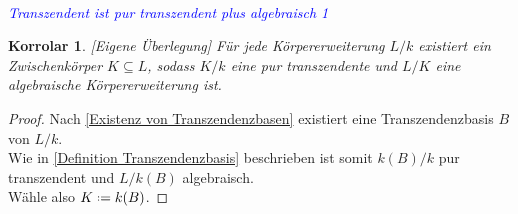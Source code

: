 \documentclass[10pt,a4paper]{report}
\newcounter{Aussage}[chapter]
\newtheorem{korrolar}[Aussage]{Korrolar}
\newcommand*{\defeq}{\mathrel{\vcenter{\baselineskip0.5ex \lineskiplimit0pt
                     \hbox{\scriptsize.}\hbox{\scriptsize.}}}%
                     =}
\begin{document}
\ \\
\textcolor{blue}{\textit{Transzendent ist pur transzendent plus algebraisch 1}}
\begin{korrolar}\label{Transzendent ist pur transzendent plus algebraisch 1}\textit{[Eigene Überlegung]}
Für jede Körpererweiterung $L/k$ existiert ein Zwischenkörper $K \subseteq L$, sodass $K/k$ eine pur transzendente und $L/K$ eine algebraische Körpererweiterung ist.
\end{korrolar}
\begin{proof}
Nach \cref{Existenz von Transzendenzbasen} existiert eine Transzendenzbasis $B$ von $L/k$.\\
Wie in \cref{Definition Transzendenzbasis} beschrieben ist somit $k(B)/k$ pur transzendent und $L/k(B)$ algebraisch.\\
Wähle also $K \defeq k(B)$.
\end{proof}
\end{document}
